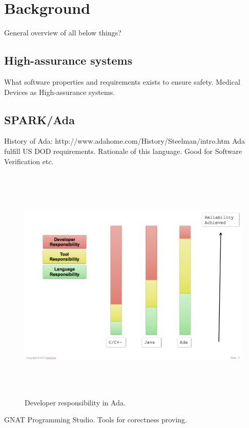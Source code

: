 
\cleardoublepage


\chapter{Background}
\label{background}

General overview of all below things?

\section{High-assurance systems}
\label{background:highas}
What software properties and requirements exists to ensure safety.
Medical Devices as High-assurance systems.


\section{SPARK/Ada}
\label{background:spark}
History of Ada: http://www.adahome.com/History/Steelman/intro.htm 
Ada fulfill US DOD requirements.
Rationale of this language. Good for Software Verification etc.
\begin{figure}[ht]%
    \begin{center}
    	\includegraphics[height=4.5in]{figures/developer_responsibility_in_ada.png}
    	\caption{Developer responsibility in Ada.}
    \end{center}
\end{figure}
GNAT Programming Studio. 
Tools for corectness proving.


